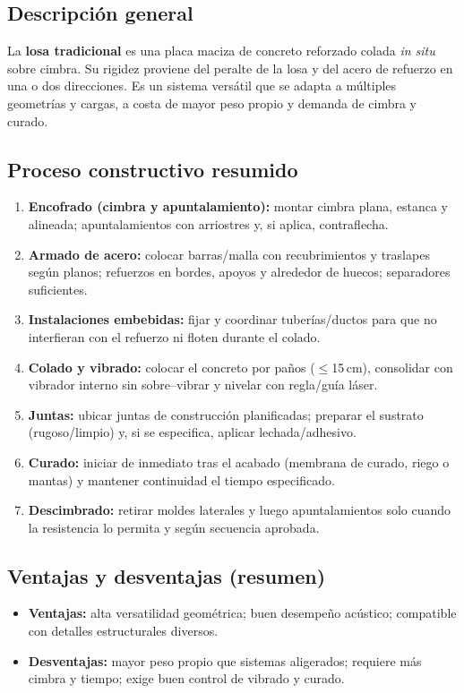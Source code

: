 \documentclass[12pt]{article}
\begin{document}
 \subsection*{Descripción general}
 La \textbf{losa tradicional} es una placa maciza de concreto reforzado colada \emph{in situ} sobre cimbra. Su rigidez proviene del peralte de la losa y del acero de refuerzo en una o dos direcciones. Es un sistema versátil que se adapta a múltiples geometrías y cargas, a costa de mayor peso propio y demanda de cimbra y curado.
 
 \subsection*{Proceso constructivo resumido}
 \begin{enumerate}[leftmargin=*, itemsep=2pt]
 	\item \textbf{Encofrado (cimbra y apuntalamiento):} montar cimbra plana, estanca y alineada; apuntalamientos con arriostres y, si aplica, contraflecha.
 	\item \textbf{Armado de acero:} colocar barras/malla con recubrimientos y traslapes según planos; refuerzos en bordes, apoyos y alrededor de huecos; separadores suficientes.
 	\item \textbf{Instalaciones embebidas:} fijar y coordinar tuberías/ductos para que no interfieran con el refuerzo ni floten durante el colado.
 	\item \textbf{Colado y vibrado:} colocar el concreto por paños (\(\leq\)15\,cm), consolidar con vibrador interno sin sobre–vibrar y nivelar con regla/guía láser.
 	\item \textbf{Juntas:} ubicar juntas de construcción planificadas; preparar el sustrato (rugoso/limpio) y, si se especifica, aplicar lechada/adhesivo.
 	\item \textbf{Curado:} iniciar de inmediato tras el acabado (membrana de curado, riego o mantas) y mantener continuidad el tiempo especificado.
 	\item \textbf{Descimbrado:} retirar moldes laterales y luego apuntalamientos solo cuando la resistencia lo permita y según secuencia aprobada.
 \end{enumerate}
 
 \subsection*{Ventajas y desventajas (resumen)}
 \begin{itemize}[leftmargin=*, itemsep=2pt]
 	\item \textbf{Ventajas:} alta versatilidad geométrica; buen desempeño acústico; compatible con detalles estructurales diversos.
 	\item \textbf{Desventajas:} mayor peso propio que sistemas aligerados; requiere más cimbra y tiempo; exige buen control de vibrado y curado.
 \end{itemize}
 
\end{document}
